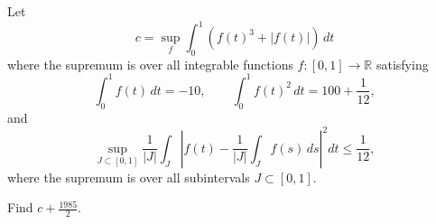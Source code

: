 \documentclass{article}
\begin{document}
Let
\[
c=\sup_f\int_0^1\left(f(t)^3+|f(t)|\right)\,dt
\]
where the supremum is over all integrable functions
\(f:[0,1]\to\mathbb R\) satisfying
\[
\int_0^1 f(t)\,dt=-10,\qquad
\int_0^1 f(t)^2\,dt=100+\frac1{12},
\]
and
\[
\sup_{J\subset[0,1]}\frac1{|J|}\int_J
\left|f(t)-\frac1{|J|}\int_J f(s)\,ds\right|^2dt
\leq\frac1{12},
\]
where the supremum is over all subintervals \(J\subset[0,1]\).

Find \(c+\frac{1985}{2}\).
\end{document}
